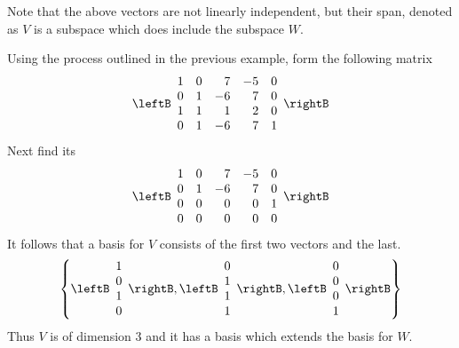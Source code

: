 \begin{solution}
Note that the above vectors are not linearly independent, but their span,
denoted as $V$ is a subspace which does include the subspace $W$. 

Using the process outlined in the previous example, form the following matrix 
\begin{equation*}
\leftB
\begin{array}{rrrrr}
1 & 0 & 7 & -5 & 0 \\ 
0 & 1 & -6 & 7 & 0 \\ 
1 & 1 & 1 & 2 & 0 \\ 
0 & 1 & -6 & 7 & 1
\end{array}
\rightB
\end{equation*}
Next find its \rref\; 
\begin{equation*}
\leftB
\begin{array}{rrrrr}
1 & 0 & 7 & -5 & 0 \\ 
0 & 1 & -6 & 7 & 0 \\ 
0 & 0 & 0 & 0 & 1 \\ 
0 & 0 & 0 & 0 & 0
\end{array}
\rightB
\end{equation*}
It follows that a basis for $V$ consists of the first two vectors and the
last. 
\begin{equation*}
\left\{ \leftB
\begin{array}{c}
1 \\ 
0 \\ 
1 \\ 
0
\end{array}
\rightB ,\leftB 
\begin{array}{c}
0 \\ 
1 \\ 
1 \\ 
1
\end{array}
\rightB ,\leftB 
\begin{array}{c}
0 \\ 
0 \\ 
0 \\ 
1
\end{array}
\rightB \right\}
\end{equation*}
Thus $V$ is of dimension 3 and it has a basis which extends the basis for $W$.
\end{solution}